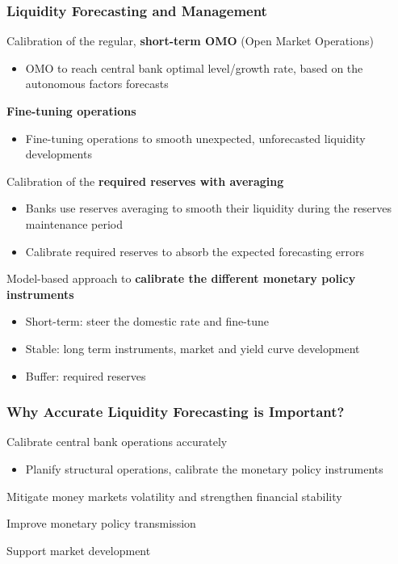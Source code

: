 \documentclass{beamer}
\newenvironment{wideitemize}{\itemize\addtolength{\itemsep}{10pt}}{\enditemize}
\begin{document}
\begin{frame}
  \frametitle{Liquidity Forecasting and Management}
  
  \begin{wideitemize}
  \item Calibration of the regular, \textbf{short-term OMO} (Open Market Operations)
    \begin{itemize}
     \item OMO to reach central bank optimal level/growth rate, based on the autonomous factors forecasts      
    \end{itemize}

  \item \textbf{Fine-tuning operations}
    \begin{itemize}
      \item Fine-tuning operations to smooth unexpected, unforecasted liquidity developments
    \end{itemize}
  
  \item Calibration of the \textbf{required reserves with averaging}
    \begin{itemize}
      \item Banks use reserves averaging to smooth their liquidity during the reserves maintenance period
      \item Calibrate required reserves to absorb the expected forecasting errors
    \end{itemize}

  \item Model-based approach to \textbf{calibrate the different monetary policy instruments}
    \begin{itemize}
      \item Short-term: steer the domestic rate and fine-tune
      \item Stable: long term instruments, market and yield curve development
      \item Buffer: required reserves 
    \end{itemize}    
  \end{wideitemize}
  
\end{frame}


\begin{frame}
  \frametitle{Why Accurate Liquidity Forecasting is Important?}

  \begin{wideitemize}
  \item Calibrate central bank operations accurately
    \begin{itemize}
    \item Planify structural operations, calibrate the monetary policy instruments
    \end{itemize}

  \item Mitigate money markets volatility and strengthen financial stability
  \item Improve monetary policy transmission
  \item Support market development
  \end{wideitemize}  
\end{frame}
\end{document}
